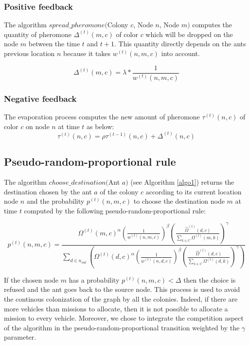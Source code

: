 \documentclass[a4paper,10pt]{article}
\begin{document}
\subsubsection{Positive feedback}
The algorithm $spread\_pheromone($Colony $c$, Node $n$, Node $m)$ computes the quantity of pheromone $\Delta^{(t)}(m,c)$ of color $c$  which will be dropped on the node $m$ between the time $t$ and $t+1$. This quantity directly depends on the ants previous location $n$ because it takes $w^{(t)}(n,m,c)$ into account.

\begin{equation*}
 \Delta^{(t)}(m,c) = \lambda * \frac{1}{w^{(t)}(n,m,c)}
\end{equation*}

\subsubsection{Negative feedback}
The evaporation process computes the new amount of pheromone $\tau^{(t)}(n,c)$ of color $c$ on node $n$ at time $t$ as below:
\begin{equation*}
 \tau^{(t)}(n,c) = \rho \tau^{(t-1)}(n,c) + \Delta^{(t)}(n,c)
\end{equation*}

\subsection{Pseudo-random-proportional rule}
The algorithm $choose\_destination($Ant $a)$ (see Algorithm \ref{algo1}) returns the destination chosen by the ant $a$ of the colony $c$ according to its current location node $n$ and the probability $p^{(t)}(n,m,c)$ to choose the destination node $m$ at time $t$ computed by the following pseudo-random-proportional rule:

\begin{equation*}
  p^{(t)}(n,m,c) = \frac
    {
      \Omega^{(t)}(m,c)^{\alpha}
      \left( \frac{1}{w^{(t)}(n,m,c)} \right) ^{\beta}
      \left( \frac{\hat \Omega^{(t)}(d,c)}{\sum_{k \in C} \Omega^{(t)}(m,k)} \right)^{\gamma}
    }
    {
      \sum_{d \in n_{out}} \left(
	\Omega^{(t)}(d,c)^{\alpha}
	\left( \frac{1}{w^{(t)}(n,d,c)} \right)^{\beta}
	\left( \frac{\hat \Omega^{(t)}(d,c)}{\sum_{k \in C} \Omega^{(t)}(d,k)} \right)^{\gamma}
      \right)
    }
\end{equation*}

If the chosen node $m$ has a probability $p^{(t)}(n,m,c) < \Delta$ then the choice is refused and the ant goes back to the source node. This process is used to avoid the continous colonization of the graph by all the colonies. Indeed, if there are more vehicles than missions to allocate, then it is not possible to allocate a mission to every vehicle. Moreover, we chose to integrate the competition aspect of the algorithm in the pseudo-random-proportional transition weighted by the $\gamma$ parameter.
\end{document}
